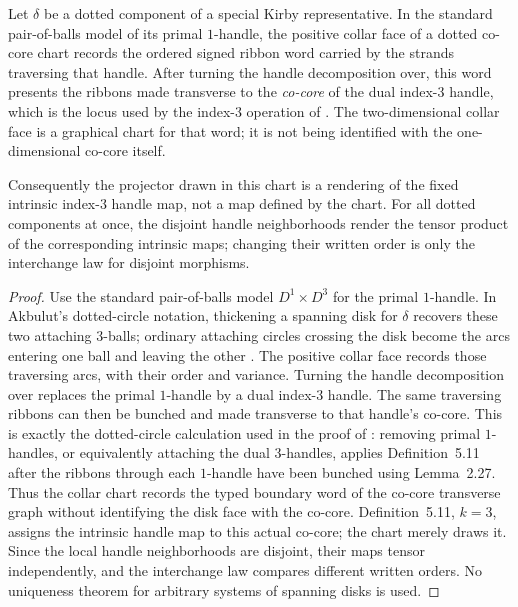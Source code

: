 \begin{proposition}
\label{prop:dotted-chart-realization}
Let $\delta$ be a dotted component of a special Kirby representative.
In the standard pair-of-balls model of its primal $1$-handle, the positive
collar face of a dotted co-core chart records the ordered signed ribbon
word carried by the strands traversing that handle.  After turning the handle
decomposition over, this word presents the ribbons made transverse to the
\emph{co-core} of the dual index-$3$ handle, which is the locus used by the
index-$3$ operation of \cite[Definition~5.11, $k=3$]{Tham2021}.  The
two-dimensional collar face is a graphical chart for that word; it is not
being identified with the one-dimensional co-core itself.

Consequently the projector drawn in this chart is a rendering of the fixed
intrinsic index-$3$ handle map, not a map defined by the chart.  For all dotted
components at once, the disjoint handle neighborhoods render the tensor
product of the corresponding intrinsic maps; changing their written order is
only the interchange law for disjoint morphisms.
\end{proposition}

\begin{proof}
Use the standard pair-of-balls model $D^1\times D^3$ for the primal
$1$-handle.  In Akbulut's dotted-circle notation, thickening a spanning disk
for $\delta$ recovers these two attaching $3$-balls; ordinary attaching
circles crossing the disk become the arcs entering one ball and leaving the
other \cite[Section~2.3.2, Figure~1]{BarenzBarrett2018}.  The positive collar
face records those traversing arcs, with their order and variance.  Turning
the handle decomposition over replaces the primal $1$-handle by a dual
index-$3$ handle.  The same traversing ribbons can then be bunched and made
transverse to that handle's co-core.  This is exactly the dotted-circle
calculation used in the proof of
\cite[proof of Proposition~9.4, p.~96]{Tham2021}: removing primal $1$-handles,
or equivalently attaching the dual $3$-handles, applies Definition~5.11 after
the ribbons through each $1$-handle have been bunched using Lemma~2.27.
Thus the collar chart records the typed boundary word of the co-core
transverse graph without identifying the disk face with the co-core.
Definition~5.11, $k=3$, assigns the intrinsic handle map to this actual
co-core; the chart merely draws it.  Since the local handle neighborhoods are
disjoint, their maps tensor independently, and the interchange law compares
different written orders.  No uniqueness theorem for arbitrary systems of
spanning disks is used.
\end{proof}

